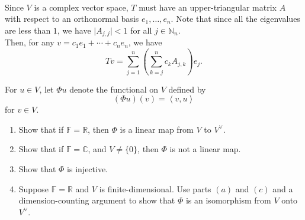 \documentclass[12pt, letterpaper]{hmcpset}
\begin{document}
\begin{solution}~
	
	Since  $V$ is a complex vector space, $T$ must have an upper-triangular matrix $A$ with respect to an orthonormal basis $e_{1}, \dots, e_{n}$. Note that since all the eigenvalues are less than $1$, we have $\lvert A_{j, j} \rvert < 1$ for all $j \in \mathbb{N}_{n}$. \\

	Then, for any $v = c_{1} e_{1} + \cdots + c_{n} e_{n}$, we have
	\[
		Tv = \sum_{j = 1}^{n} \left ( \sum_{k = j}^{n} c_{k} A_{j, k} \right ) e_{j}.
	\]
\end{solution}

\pagebreak

\begin{problem}[17.]
	For $u \in V$, let $\Phi u$ denote the functional on $V$ defined by
	\[
		(\Phi u)(v) = \left < v, u \right >
	\]
	for $v \in V$.
	\begin{enumerate}
		\item
			Show that if $\mathbb F = \mathbb R$, then $\Phi$ is a linear map from $V$ to $V^{\vee}$.
		\item
			Show that if $\mathbb F = \mathbb C$, and $V \neq \{ 0 \}$, then $\Phi$ is not a linear map.
		\item
			Show that $\Phi$ is injective.
		\item
			Suppose $\mathbb F = \mathbb R$ and $V$ is finite-dimensional. Use parts $(a)$ and $(c)$ and a dimension-counting argument to show that $\Phi$ is an isomorphism from $V$ onto $V^{\vee}$.
	\end{enumerate}
\end{problem}
\end{document}
